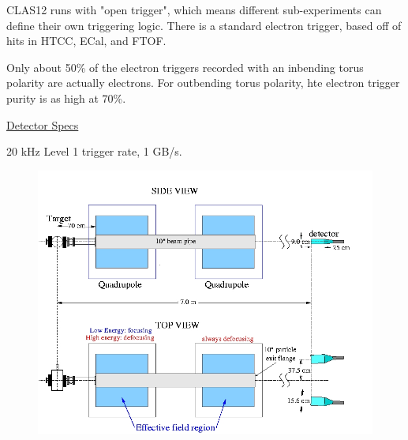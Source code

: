 
            CLAS12 runs with "open trigger", which means different sub-experiments can define their own triggering logic. There is a standard electron trigger, based off of hits in HTCC, ECal, and FTOF. 

        Only about 50\% of the electron triggers recorded with an inbending torus polarity are actually electrons. For outbending torus polarity, hte electron trigger purity is as high at 70\%. 
    
    \href{https://www.jlab.org/Hall-B/clas12-web/}{Detector Specs}
    
    20 kHz Level 1 trigger rate, 1 GB/s.


    
    
            \begin{figure}[H]
    			\centering
    			\includegraphics[width=12cm]{Chapters/Ch2-Experiment/clas-12-exp/clas-detectors/other/pics/hall-b-poll-1.jpg}
    			\caption{ }
			\end{figure}
			
